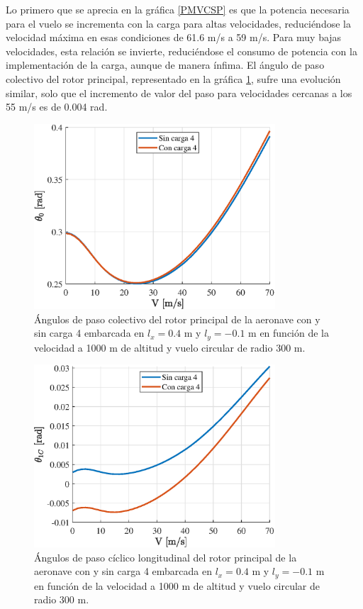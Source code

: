 Lo primero que se aprecia en la gráfica \ref{PMVCSP} es que la potencia necesaria para el vuelo se incrementa con la carga para altas velocidades, reduciéndose la velocidad máxima en esas condiciones de 61.6 m/s a 59 m/s. Para muy bajas velocidades, esta relación se invierte, reduciéndose el consumo de potencia con la implementación de la carga, aunque de manera ínfima. El ángulo de paso colectivo del rotor principal, representado en la gráfica \ref{Theta0VCSP}, sufre una evolución similar, solo que el incremento de valor del paso para velocidades cercanas a los 55 m/s es de 0.004 rad.
\begin{figure}
	\centering
	\includegraphics[width=90mm]{graficos/theta0VCSP}
	\caption{Ángulos de paso colectivo del rotor principal de la aeronave con y sin carga 4 embarcada en $l_x=0.4$ m y $l_y=-0.1$ m en función de la velocidad a 1000 m de altitud y vuelo circular de radio 300 m.}
	\label{Theta0VCSP}
\end{figure}
\begin{figure}
	\centering
	\includegraphics[width=90mm]{graficos/theta1CVCSP}
	\caption{Ángulos de paso cíclico longitudinal del rotor principal de la aeronave con y sin carga 4 embarcada en $l_x=0.4$ m y $l_y=-0.1$ m en función de la velocidad a 1000 m de altitud y vuelo circular de radio 300 m.}
	\label{Theta1CVCSP}
\end{figure}
